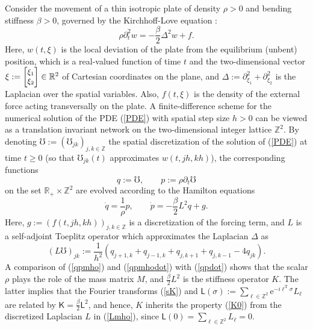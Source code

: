 \documentclass[letterpaper, 10pt, conference]{ieeeconf}  %
\def\>{\geqslant}           %
\def\d{\partial}
\def\mZ{\mathbb{Z}}    %
\def\mR{\mathbb{R}}    %
\def\rT{\mathrm{T}}        %
\def\re{\mathrm{e}}        %
\def\x{\times}
\def\sK{\mathsf{K}}
\def\sL{\mathsf{L}}
\def\mZ{\mathbb{Z}}
\begin{document}
Consider
the movement of a thin isotropic plate of density $\rho>0$ and bending stiffness $\beta>0$, governed by the Kirchhoff-Love equation \cite{R_2007}:
\begin{equation}
\label{PDE}
    \rho\d_t^2 w = -\frac{\beta}{2} \Delta^2 w +f.
\end{equation}
Here, $w(t,\xi)$ is the local deviation of the plate from the equilibrium (unbent) position, which is a real-valued  function of time $t$ and the two-dimensional vector $\xi:= {\small\begin{bmatrix}\xi_1\\ \xi_2\end{bmatrix}} \in \mR^2$ of Cartesian coordinates on the plane, and $\Delta:= \d_{\xi_1}^2 + \d_{\xi_2}^2$ is the Laplacian over the spatial variables. Also, $f(t,\xi)$ is the density of the external force acting transversally on the plate. A finite-difference scheme  for the numerical solution of the PDE (\ref{PDE}) with spatial step size $h>0$ can be viewed as a translation invariant network on the two-dimensional integer lattice $\mZ^2$. By denoting $\mho:= (\mho_{jk})_{j,k\in \mZ}$ the spatial discretization of the solution of (\ref{PDE}) at time $t\>0$ (so that $\mho_{jk}(t)$ approximates $w(t,jh,kh)$), the corresponding functions
\begin{equation}
\label{qpmho}
    q:= \mho,
    \qquad
    p:= \rho \d_t \mho
\end{equation}
on the set $\mR_+\x \mZ^2$
are evolved according to the Hamilton equations
\begin{equation}
\label{qpmhodot}
    \dot{q}
    =
    \frac{1}{\rho} p,
    \qquad
    \dot{p}
    =
    -\frac{\beta}{2}L^2 q + g.
\end{equation}
Here, $g:= (f(t,jh,kh))_{j,k\in \mZ}$ is a discretization of the forcing term,
and $L$ is a self-adjoint Toeplitz operator which approximates the Laplacian $\Delta$ as
\begin{equation}
\label{Lmho}
    (L\mho)_{jk}
    :=
    \frac{1}{h^2}
    (
        q_{j+1,k}+q_{j-1,k}
        +
        q_{j,k+1}+q_{j,k-1}
        -
        4q_{jk}
    ).
\end{equation}
A comparison of (\ref{qpmho}) and (\ref{qpmhodot}) with (\ref{qpdot}) shows that the scalar $\rho$ plays the role of the mass matrix $M$, and $\frac{\beta}{2}L^2$ is the stiffness operator $K$. The latter implies that the Fourier transforms (\ref{sK}) and $
    \sL(\sigma)
    :=
    \sum_{\ell\in \mZ^2}
    \re^{-i\ell^{\rT}\sigma}
    L_\ell
$ are related by
$\sK = \frac{\beta}{2}\sL^2$, and hence, $K$ inherits the property (\ref{K0}) from the discretized Laplacian $L$ in (\ref{Lmho}), since $\sL(0) = \sum_{\ell \in \mZ^2} L_\ell = 0$.
\end{document}
